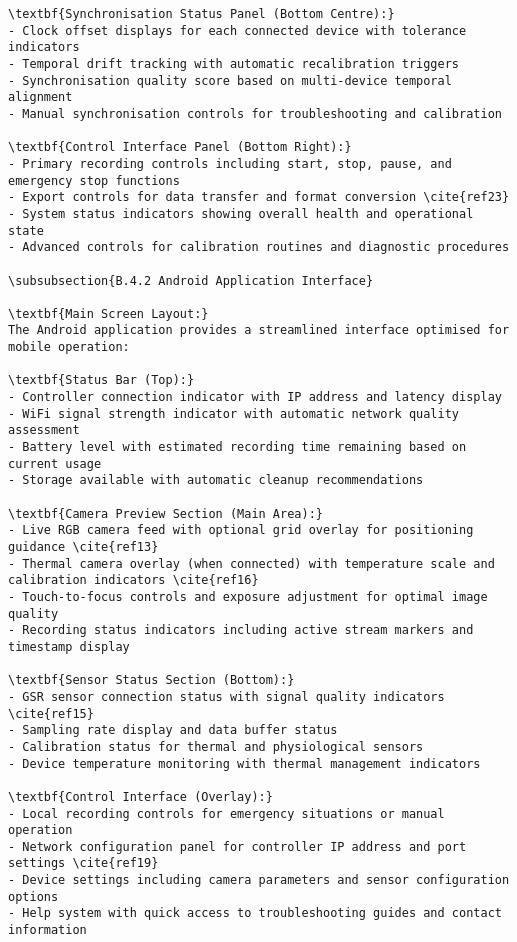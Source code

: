 \begin{verbatim}
\textbf{Synchronisation Status Panel (Bottom Centre):}
- Clock offset displays for each connected device with tolerance indicators
- Temporal drift tracking with automatic recalibration triggers
- Synchronisation quality score based on multi-device temporal alignment
- Manual synchronisation controls for troubleshooting and calibration

\textbf{Control Interface Panel (Bottom Right):}
- Primary recording controls including start, stop, pause, and emergency stop functions
- Export controls for data transfer and format conversion \cite{ref23}
- System status indicators showing overall health and operational state
- Advanced controls for calibration routines and diagnostic procedures

\subsubsection{B.4.2 Android Application Interface}

\textbf{Main Screen Layout:}
The Android application provides a streamlined interface optimised for mobile operation:

\textbf{Status Bar (Top):}
- Controller connection indicator with IP address and latency display
- WiFi signal strength indicator with automatic network quality assessment
- Battery level with estimated recording time remaining based on current usage
- Storage available with automatic cleanup recommendations

\textbf{Camera Preview Section (Main Area):}
- Live RGB camera feed with optional grid overlay for positioning guidance \cite{ref13}
- Thermal camera overlay (when connected) with temperature scale and calibration indicators \cite{ref16}
- Touch-to-focus controls and exposure adjustment for optimal image quality
- Recording status indicators including active stream markers and timestamp display

\textbf{Sensor Status Section (Bottom):}
- GSR sensor connection status with signal quality indicators \cite{ref15}
- Sampling rate display and data buffer status
- Calibration status for thermal and physiological sensors
- Device temperature monitoring with thermal management indicators

\textbf{Control Interface (Overlay):}
- Local recording controls for emergency situations or manual operation
- Network configuration panel for controller IP address and port settings \cite{ref19}
- Device settings including camera parameters and sensor configuration options
- Help system with quick access to troubleshooting guides and contact information


\end{verbatim}
